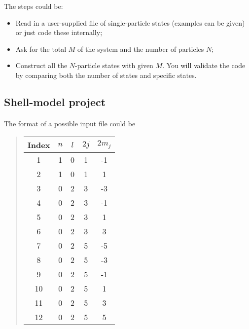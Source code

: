 The steps could be:

\begin{itemize}
\item Read in a user-supplied file of single-particle states (examples can be given) or just code these internally;

\item Ask for the total $M$ of the system and the number of particles $N$;

\item Construct all the $N$-particle states with given $M$.  You will validate the code by  comparing both the number of states and specific states.
\end{itemize}

\noindent



\subsection*{Shell-model project}

\paragraph{}
The format of a possible input  file could be

\begin{quote}
\begin{tabular}{ccccc}
\hline
\multicolumn{1}{c}{ Index } & \multicolumn{1}{c}{ $n$ } & \multicolumn{1}{c}{ $l$ } & \multicolumn{1}{c}{ $2j$ } & \multicolumn{1}{c}{ $2m_j$ } \\
\hline
1     & 1   & 0   & 1    & -1     \\
2     & 1   & 0   & 1    & 1      \\
3     & 0   & 2   & 3    & -3     \\
4     & 0   & 2   & 3    & -1     \\
5     & 0   & 2   & 3    & 1      \\
6     & 0   & 2   & 3    & 3      \\
7     & 0   & 2   & 5    & -5     \\
8     & 0   & 2   & 5    & -3     \\
9     & 0   & 2   & 5    & -1     \\
10    & 0   & 2   & 5    & 1      \\
11    & 0   & 2   & 5    & 3      \\
12    & 0   & 2   & 5    & 5      \\
\hline
\end{tabular}
\end{quote}

